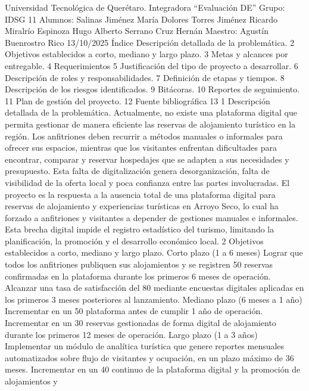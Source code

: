 Universidad Tecnológica de Querétaro.
Integradora
“Evaluación DE”
Grupo: IDSG 11
Alumnos:
Salinas Jiménez María Dolores
Torres Jiménez Ricardo
Miralrío Espinoza Hugo Alberto
Serrano Cruz Hernán
Maestro: Agustín Buenrostro Rico
13/10/2025
Índice
Descripción detallada de la problemática. 2
Objetivos establecidos a corto, mediano y largo plazo. 3
Metas y alcances por entregable. 4
Requerimientos 5
Justificación del tipo de proyecto a desarrollar. 6
Descripción de roles y responsabilidades. 7
Definición de etapas y tiempos. 8
Descripción de los riesgos identificados. 9
Bitácoras. 10
Reportes de seguimiento. 11
Plan de gestión del proyecto. 12
Fuente bibliográfica 13
1
Descripción detallada de la problemática.
Actualmente, no existe una plataforma digital que permita gestionar de manera
eficiente las reservas de alojamiento turístico en la región. Los anfitriones deben
recurrir a métodos manuales o informales para ofrecer sus espacios, mientras que
los visitantes enfrentan dificultades para encontrar, comparar y reservar
hospedajes que se adapten a sus necesidades y presupuesto. Esta falta de
digitalización genera desorganización, falta de visibilidad de la oferta local y poca
confianza entre las partes involucradas.
El proyecto es la respuesta a la ausencia total de una plataforma digital para
reservas de alojamiento y experiencias turísticas en Arroyo Seco, lo cual ha
forzado a anfitriones y visitantes a depender de gestiones manuales e informales.
Esta brecha digital impide el registro estadístico del turismo, limitando la
planificación, la promoción y el desarrollo económico local.
2
Objetivos establecidos a corto, mediano y largo
plazo.
Corto plazo (1 a 6 meses)
 Lograr que todos los anfitriones publiquen sus alojamientos y se registren
50 reservas confirmadas en la plataforma durante los primeros 6 meses de
operación.
 Alcanzar una tasa de satisfacción del 80%
mediante encuestas digitales aplicadas en los primeros 3 meses posteriores
al lanzamiento.
Mediano plazo (6 meses a 1 año)
 Incrementar en un 50%
plataforma antes de cumplir 1 año de operación.
 Incrementar en un 30%
reservas gestionadas de forma digital de alojamiento durante los primeros
12 meses de operación.
Largo plazo (1 a 3 años)
 Implementar un módulo de analítica turística que genere reportes
mensuales automatizados sobre flujo de visitantes y ocupación, en un plazo
máximo de 36 meses.
 Incrementar en un 40%
continuo de la plataforma digital y la promoción de alojamientos y
